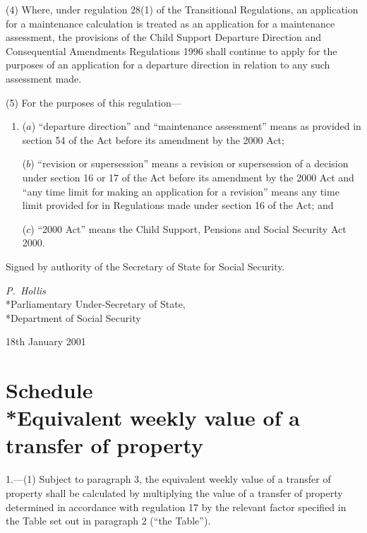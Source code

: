 \documentclass[12pt,a4paper]{article}
\begin{document}
(4) Where, under regulation 28(1) of the Transitional Regulations, an application for a maintenance calculation is treated as an application for a maintenance assessment, the provisions of the Child Support Departure Direction and Consequential Amendments Regulations 1996 shall continue to apply for the purposes of an application for a departure direction in relation to any such assessment made.

(5) For the purposes of this regulation—
\begin{enumerate}\item[]
($a$) “departure direction” and “maintenance assessment” means as provided in section 54 of the Act before its amendment by the 2000 Act;

($b$) “revision or supersession” means a revision or supersession of a decision under section 16 or 17 of the Act before its amendment by the 2000 Act and “any time limit for making an application for a revision” means any time limit provided for in Regulations made under section 16 of the Act; and

($c$) “2000 Act” means the Child Support, Pensions and Social Security Act 2000. 
\end{enumerate}


\bigskip

Signed 
by authority of the Secretary of State for Social Security.

{\raggedleft
\emph{P.~Hollis}\\*Parliamentary Under-Secretary of State,\\*Department of Social Security

}

18th January 2001

\small

\part[Schedule --- Equivalent weekly value of a transfer of property]{Schedule\\*Equivalent weekly value of a transfer of property}

\renewcommand\parthead{--- Schedule}

1.---(1)  Subject to paragraph 3, the equivalent weekly value of a transfer of property shall be calculated by multiplying the value of a transfer of property determined in accordance with regulation 17 by the relevant factor specified in the Table set out in paragraph 2 (“the Table”).
\end{document}
